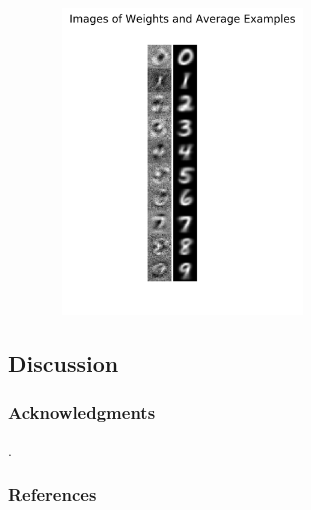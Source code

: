 \documentclass{article} %
\begin{document}
\begin{figure}[h]
	\centering	
	\includegraphics[width=2.8in,height=3.2in]{../softmax/figs/image_of_weights_and_digits.png} 
	\caption{}
	\label{figure: 3}
\end{figure}

\subsection{Discussion}




\subsubsection*{Acknowledgments}

. 

\subsubsection*{References}
\end{document}
